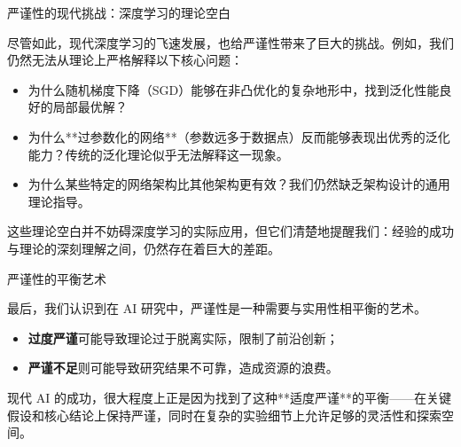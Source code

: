 严谨性的现代挑战：深度学习的理论空白

尽管如此，现代深度学习的飞速发展，也给严谨性带来了巨大的挑战。例如，我们仍然无法从理论上严格解释以下核心问题：

\begin{itemize}
\item 为什么随机梯度下降（SGD）能够在非凸优化的复杂地形中，找到泛化性能良好的局部最优解？
\item 为什么**过参数化的网络**（参数远多于数据点）反而能够表现出优秀的泛化能力？传统的泛化理论似乎无法解释这一现象。
\item 为什么某些特定的网络架构比其他架构更有效？我们仍然缺乏架构设计的通用理论指导。
\end{itemize}

这些理论空白并不妨碍深度学习的实际应用，但它们清楚地提醒我们：经验的成功与理论的深刻理解之间，仍然存在着巨大的差距。

严谨性的平衡艺术

最后，我们认识到在 AI 研究中，严谨性是一种需要与实用性相平衡的艺术。
\begin{itemize}
\item \textbf{过度严谨}可能导致理论过于脱离实际，限制了前沿创新；
\item \textbf{严谨不足}则可能导致研究结果不可靠，造成资源的浪费。
\end{itemize}
现代 AI 的成功，很大程度上正是因为找到了这种**适度严谨**的平衡——在关键假设和核心结论上保持严谨，同时在复杂的实验细节上允许足够的灵活性和探索空间。


